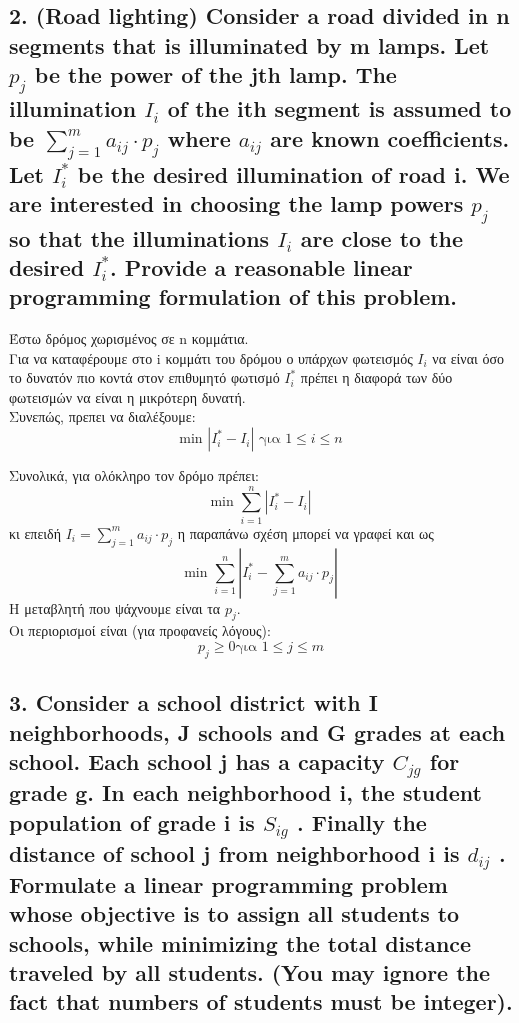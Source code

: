 \documentclass[12pt]{article}
\newcommand{\abs}[1]{\left\lvert#1\right\rvert}
\begin{document}
\vspace{2in}

\pagebreak

\subsection*{2. (Road lighting) Consider a road divided in n segments that is illuminated by m
	lamps. Let \(p_{j}\) be the power of the jth lamp. The illumination \(I_{i}\) of the ith segment is assumed
	to be \(\sum_{j=1}^{m}{a_{ij} \cdot p_{j}}\)
	where \(a_{ij}\) are known coefficients. Let \(I_{i}^{*}\) be the desired illumination of road i.
	We are interested in choosing the lamp powers \(p_{j}\) so that the illuminations \(I_{i}\) are close to the
	desired \(I_{i}^{*}\). Provide a reasonable linear programming formulation of this problem.}

Έστω δρόμος χωρισμένος σε n κομμάτια. \\

Για να καταφέρουμε στο i κομμάτι του δρόμου ο υπάρχων φωτεισμός \(I_{i}\) να είναι όσο το δυνατόν πιο κοντά στον επιθυμητό φωτισμό \(I_{i}^{*}\) πρέπει η διαφορά των δύο φωτεισμών να είναι η μικρότερη δυνατή. \\

Συνεπώς, πρεπει να διαλέξουμε:
\[ \mbox{min }\abs{ I_{i}^{*} - I_{i} } \mbox{ για } 1 \leq i \leq n \]

Συνολικά, για ολόκληρο τον δρόμο πρέπει: \\
\[ \mbox{min } \sum_{i=1}^{n}{\abs{ I_{i}^{*} - I_{i} }}  \]
κι επειδή \(I_{i} = \sum_{j=1}^{m}{a_{ij} \cdot p_{j}}\) η παραπάνω σχέση μπορεί να γραφεί και ως \\
\[ \mbox{min } \sum_{i=1}^{n}{\abs{ I_{i}^{*} - \sum_{j=1}^{m}{a_{ij} \cdot p_{j}} }}  \]
Η μεταβλητή που ψάχνουμε είναι τα \(p_{j}\). \\

Οι περιορισμοί είναι (για προφανείς λόγους): \\
\[ p_{j} \geq 0 \mbox{για } 1 \leq j \leq m \]

\vspace{2in}

\pagebreak

\subsection*{3. Consider a school district with I neighborhoods, J schools and G grades
	at each school. Each school j has a capacity \(C_{jg}\) for grade g. In each neighborhood i, the
	student population of grade i is \(S_{ig}\) . Finally the distance of school j from neighborhood i is \(d_{ij}\) .
	Formulate a linear programming problem whose objective is to assign all students to schools,
	while minimizing the total distance traveled by all students. (You may ignore the fact that
	numbers of students must be integer).}
\end{document}
